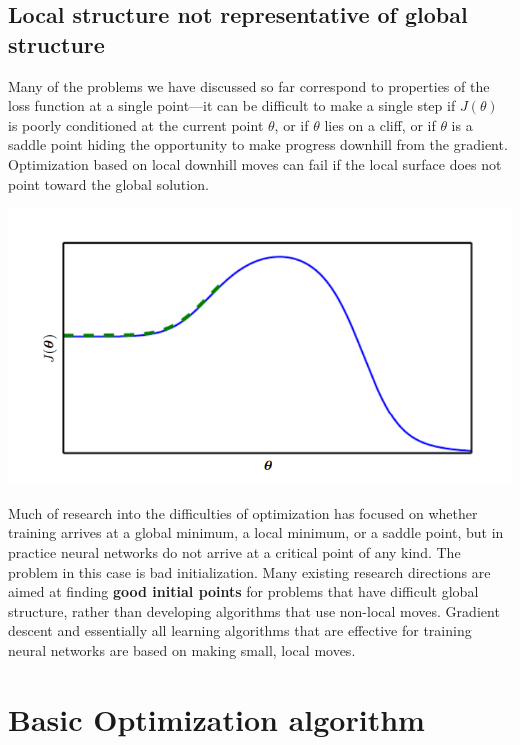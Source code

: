\subsection{Local structure not representative of global structure}
Many of the problems we have discussed so far correspond to properties of the loss function at a single point—it can be difficult to make a single step if $J(\theta)$ is poorly conditioned at the current point $\theta$, or if $\theta$ lies on a cliff, or if $\theta$ is a saddle point hiding the opportunity to make progress downhill from the gradient. Optimization based on local downhill moves can fail if the local surface does not point toward the global solution.
\begin{center}
    \includegraphics[]{images/bad-init.png}
\end{center}
Much of research into the difficulties of optimization has focused on whether training arrives at a global minimum, a local minimum, or a saddle point, but in practice neural networks do not arrive at a critical point of any kind. The problem in this case is bad initialization.\newline\newline
Many existing research directions are aimed at finding \textbf{good initial points} for problems that have difficult global structure, rather than developing algorithms that use non-local moves. Gradient descent and essentially all learning algorithms that are effective for training neural networks are based on making small, local moves.

\section{Basic Optimization algorithm}

